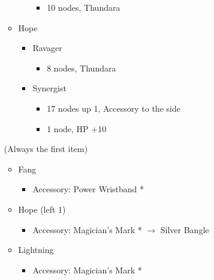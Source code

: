 \begin{paracol}{2}
\begin{menu}
\begin{itemize}
\begin{itemize}
\begin{itemize}
\begin{itemize}
						            \item 10 nodes, Thundara
					            \end{itemize}
				      \end{itemize}
				\item Hope
				      \begin{itemize}
					      \item Ravager
					            \begin{itemize}
						            \item 8 nodes, Thundara
					            \end{itemize}
					      \item Synergist
					            \begin{itemize}
						            \item 17 nodes up 1, Accessory to the side
						            \item 1 node, HP +10
					            \end{itemize}
				      \end{itemize}
			\end{itemize}
			\equip (Always the first item)
			\begin{itemize}
				\item Fang
				      \begin{itemize}
					      \item Accessory: Power Wristband *
				      \end{itemize}
				\item Hope (left 1)
				      \begin{itemize}
					      \item Accessory:  Magician's Mark * $\rightarrow$ Silver Bangle
				      \end{itemize}
				\item Lightning
				      \begin{itemize}
					      \item Accessory: Magician's Mark *
				      \end{itemize}
			\end{itemize}
		\end{itemize}
	\end{menu}


\end{paracol}
